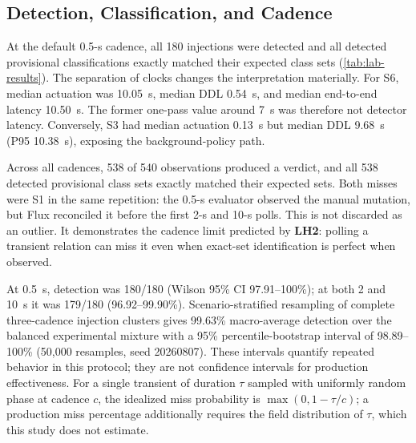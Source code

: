 \begin{table}[t]
\centering
\caption{Repeated Live-Stack Results at the Default 0.5-s Cadence (20 Runs
per Scenario). Expected Is a Class Set; ``First Verdict'' Is the Evaluator's
Priority-Ordered Output. DR and ESA Are Percentages. Act., DDL, P95 DDL,
End-to-End (E2E), and TTE Are Seconds; All Except P95 Are Medians.}
\label{tab:lab-results}
\scriptsize
\resizebox{\textwidth}{!}{}
\end{table}

\subsection{Detection, Classification, and Cadence}
At the default 0.5-s cadence, all 180 injections were detected and all
detected provisional classifications exactly matched their expected class sets
(\cref{tab:lab-results}). The separation of clocks changes the interpretation
materially. For S6, median actuation was 10.05~s, median DDL 0.54~s, and
median end-to-end latency 10.50~s. The former one-pass value around 7~s was
therefore not detector latency. Conversely, S3 had median actuation 0.13~s
but median DDL 9.68~s (P95 10.38~s), exposing the background-policy path.

Across all cadences, 538 of 540 observations produced a verdict, and all 538
detected provisional class sets exactly matched their expected sets. Both misses were S1 in the
same repetition: the 0.5-s evaluator observed the manual mutation, but Flux
reconciled it before the first 2-s and 10-s polls. This is not discarded as
an outlier. It demonstrates the cadence limit predicted by \textbf{LH2}:
polling a transient relation can miss it even when exact-set identification is perfect
when observed.

At 0.5~s, detection was 180/180 (Wilson 95\% CI 97.91--100\%); at both
2 and 10~s it was 179/180 (96.92--99.90\%). Scenario-stratified resampling
of complete three-cadence injection clusters gives 99.63\% macro-average
detection over the balanced experimental mixture with a
95\% percentile-bootstrap interval of 98.89--100\% (50,000 resamples,
seed 20260807). These intervals quantify repeated behavior in this protocol;
they are not confidence intervals for production effectiveness. For a single
transient of duration $\tau$ sampled with uniformly random phase at cadence
$c$, the idealized miss probability is
$\max(0,1-\tau/c)$; a production miss percentage additionally requires the
field distribution of $\tau$, which this study does not estimate.

